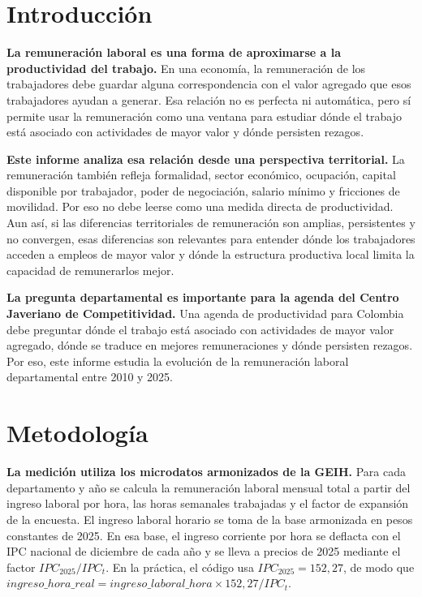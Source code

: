 \section{Introducción}

\textbf{La remuneración laboral es una forma de aproximarse a la productividad del trabajo.} En una economía, la remuneración de los trabajadores debe guardar alguna correspondencia con el valor agregado que esos trabajadores ayudan a generar. Esa relación no es perfecta ni automática, pero sí permite usar la remuneración como una ventana para estudiar dónde el trabajo está asociado con actividades de mayor valor y dónde persisten rezagos.

\textbf{Este informe analiza esa relación desde una perspectiva territorial.} La remuneración también refleja formalidad, sector económico, ocupación, capital disponible por trabajador, poder de negociación, salario mínimo y fricciones de movilidad. Por eso no debe leerse como una medida directa de productividad. Aun así, si las diferencias territoriales de remuneración son amplias, persistentes y no convergen, esas diferencias son relevantes para entender dónde los trabajadores acceden a empleos de mayor valor y dónde la estructura productiva local limita la capacidad de remunerarlos mejor.

\textbf{La pregunta departamental es importante para la agenda del Centro Javeriano de Competitividad.} Una agenda de productividad para Colombia debe preguntar dónde el trabajo está asociado con actividades de mayor valor agregado, dónde se traduce en mejores remuneraciones y dónde persisten rezagos. Por eso, este informe estudia la evolución de la remuneración laboral departamental entre 2010 y 2025.

\section{Metodología}

\textbf{La medición utiliza los microdatos armonizados de la GEIH.} Para cada departamento y año se calcula la remuneración laboral mensual total a partir del ingreso laboral por hora, las horas semanales trabajadas y el factor de expansión de la encuesta. El ingreso laboral horario se toma de la base armonizada en pesos constantes de 2025. En esa base, el ingreso corriente por hora se deflacta con el IPC nacional de diciembre de cada año y se lleva a precios de 2025 mediante el factor \(IPC_{2025}/IPC_t\). En la práctica, el código usa \(IPC_{2025}=152{,}27\), de modo que \(ingreso\_hora\_real = ingreso\_laboral\_hora \times 152{,}27/IPC_t\).

